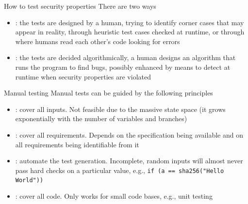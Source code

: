 \begin{parag}{How to test security properties}
    There are two ways
    \begin{itemize}
        \item {}: the tests are designed by a human, trying to identify corner cases that may appear in reality, through heuristic test cases checked at runtime, or through  where humans read each other's code looking for errors
        \item {}: the tests are decided algorithmically, a human designs an algorithm that runs the program to find bugs, possibly enhanced by means to detect at runtime when security properties are violated
    \end{itemize}
\end{parag}

\begin{parag}{Manual testing}
    Manual tests can be guided by the following principles
    \begin{itemize}
        \item {}: cover all inputs. Not feasible due to the massive state space (it grows exponentially with the number of variables and branches)
        \item {}: cover all requirements. Depends on the specification being available and on all requirements being identifiable from it
        \item {}: automate the test generation. Incomplete, random inputs will almost never pass hard checks on a particular value, e.g., \texttt{if (a == sha256("Hello World"))}
        \item {}: cover all code. Only works for small code bases, e.g., unit testing
    \end{itemize}
\end{parag}

